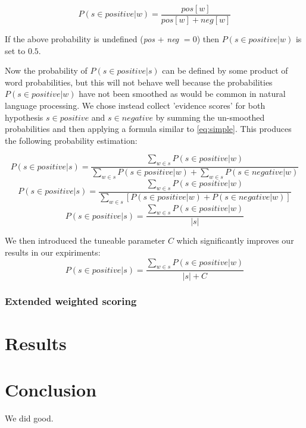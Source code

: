 \documentclass[11pt]{article}
\begin{document}
\begin{equation} \label{eq:simple}
P(s\in positive | w) = \frac{pos[w]}{pos[w] + neg[w]}
\end{equation}

If the above probability is undefined (\textit{pos} + \textit{neg} $= 0$) then $P(s\in positive | w)$ is set to $0.5$.

Now the probability of $P(s\in positive | s)$ can be defined by some product of word probabilities, but this will not behave well because the probabilities $P(s\in positive | w)$ have not been smoothed as would be common in natural language processing. We chose instead collect 'evidence scores' for both hypothesis $s\in positive$ and $s\in negative$ by summing the un-smoothed probabilities and then applying a formula similar to \ref{eq:simple}. This produces the following probability estimation:

\begin{equation} P(s\in positive | s)  = \frac{\sum_{w\in s} P(s\in positive | w)}{\sum_{w\in s} P(s\in positive | w) + \sum_{w\in s} P(s\in negative | w)}  \end{equation}
\begin{equation} P(s\in positive | s)  = \frac{\sum_{w\in s} P(s\in positive | w)}{\sum_{w\in s} [ P(s\in positive | w) + P(s\in negative | w) ]}  \end{equation}
\begin{equation} P(s\in positive | s)  = \frac{\sum_{w\in s} P(s\in positive | w)}{ | s | }  \end{equation}

We then introduced the tuneable parameter $C$ which significantly improves our results in our expiriments:
\begin{equation} P(s\in positive | s)  = \frac{\sum_{w\in s} P(s\in positive | w)}{ | s | + C}  \end{equation}

\subsubsection{Extended weighted scoring}

\section{Results}
\label{sec:results}

\section{Conclusion}
\label{sec:conclusion}
We did good.


\end{document}
